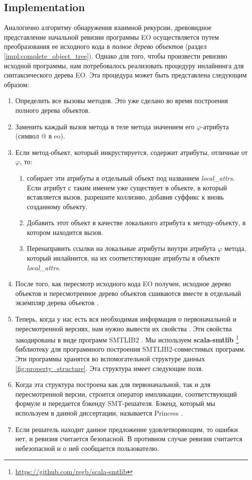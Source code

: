 \subsection{Implementation}
Аналогично алгоритму обнаружения взаимной рекурсии, древовидное представление начальной ревизии программы EO осуществляется путем преобразования ее исходного кода в \textit{полное дерево объектов} (раздел \ref{impl:complete_object_tree}). Однако для того, чтобы произвести ревизию исходной программы, нам потребовалось реализовать процедуру инлайнинга для синтаксического дерева EO. Эта процедура может быть представлена следующим образом:
\begin{enumerate}
  \item Определить все вызовы методов. Это уже сделано во время построения полного дерева объектов.
  \item Заменить каждый вызов метода в теле метода значением его $\varphi$-атрибута (символ @ в eo).
  \item Если метод-объект, который инкрустируется, содержит атрибуты, отличные от $\varphi$, то:
  \begin{enumerate}
    \item собирает эти атрибуты в отдельный объект под названием \textit{local\_attrs}. Если атрибут с таким именем уже существует в объекте, в который вставляется вызов, разрешите коллизию, добавив суффикс к вновь созданному объекту. 
    \item Добавить этот объект в качестве локального атрибута к методу-объекту, в котором находится вызов. 
    \item Перенаправить ссылки на локальные атрибуты внутри атрибута $\varphi$ метода, который инлайнится, на их соответствующие атрибуты в объекте \textit{local\_attrs}.
  \end{enumerate}

  \item После того, как пересмотр исходного кода EO получен, исходное дерево объектов и пересмотренное дерево объектов сшиваются вместе в отдельный экземпляр дерева объектов .

  \item Теперь, когда у нас есть вся необходимая информация о первоначальной и пересмотренной версиях, нам нужно вывести их свойства . Эти свойства закодированы в виде программ SMTLIB2 \cite{smtlib}. Мы используем \textbf{scala-smtlib} \footnote{\url{https://github.com/regb/scala-smtlib}} библиотеку для программного построения SMTLIB2-совместимых программ. Эти программы хранятся во вспомогательной структуре данных \ref{fig:property_structure}. Эта структура имеет следующие поля.
  \item Когда эта структура построена как для первоначальной, так и для пересмотренной версии, строится оператор импликации, соответствующий формуле  и передается бэкенду SMT-решателя. Бэкенд, который мы используем в данной диссертации, называется Princess \cite{princess}.
  \item Если решатель находит данное предложение удовлетворяющим, то ошибки нет, и ревизия считается безопасной. В противном случае ревизия считается небезопасной и о ней сообщается пользователю. 
\end{enumerate}

